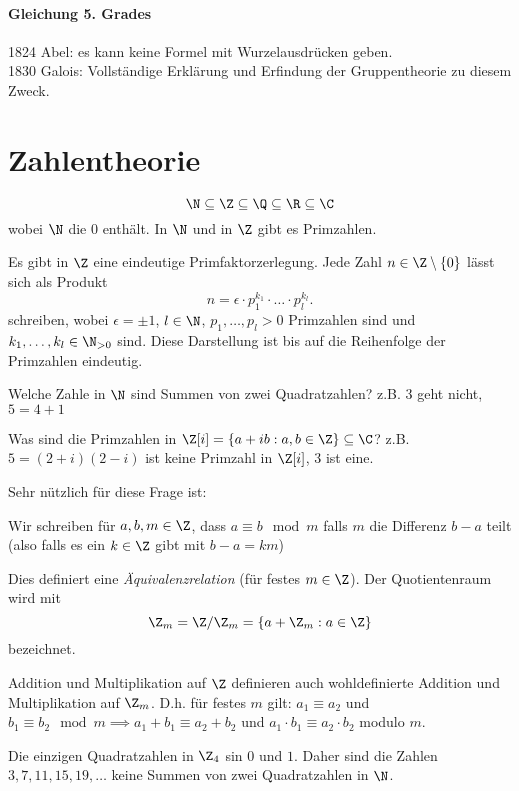 \paragraph{Gleichung 5. Grades}
1824 Abel: es kann keine Formel mit Wurzelausdrücken geben.\\
1830 Galois: Vollständige Erklärung und Erfindung der Gruppentheorie zu diesem Zweck.

\section{Zahlentheorie}
\[
\N \subseteq \Z \subseteq \Q \subseteq \R \subseteq \C
\] 
wobei $\N$ die $0$ enthält. In $\N$ und in $\Z$ gibt es Primzahlen.
\begin{theorem}
	Es gibt in $\Z$ eine eindeutige Primfaktorzerlegung.
	Jede Zahl $n \in \Z \setminus \{0\}$ lässt sich als Produkt
	\[
	n = \epsilon \cdot p_1^{k_1} \cdot \ldots \cdot p_{l}^{k_{l}}
	.\] 
	schreiben, wobei $\epsilon = \pm 1$, $l \in \N$, $p_1,\ldots,p_{l} > 0$ Primzahlen sind und $k_1,\ldots,k_{l} \in \N_{> 0}$ sind.
	Diese Darstellung ist bis auf die Reihenfolge der Primzahlen eindeutig.
\end{theorem}

Welche Zahle in $\N$ sind Summen von zwei Quadratzahlen?
z.B. $3$ geht nicht, $5 = 4+1$

Was sind die Primzahlen in $\Z[i] = \{a + ib: a,b \in \Z\} \subseteq \C$?
z.B. $5 = (2+i)(2-i)$ ist keine Primzahl in $\Z[i]$, $3$ ist eine.

Sehr nützlich für diese Frage ist:
\begin{definition}
	Wir schreiben für $a,b,m \in \Z$, dass $a \equiv b \mod m$ falls $m$ die Differenz $b-a$ teilt (also falls es ein  $k \in \Z$ gibt mit $b-a = k m $)
\end{definition}

Dies definiert eine \emph{Äquivalenzrelation} (für festes $m \in \Z$).
Der Quotientenraum wird mit 
\[
	\Z_{m} = \Z / \Z_{m} = \{a + \Z_{m}: a \in \Z\} 
\]
bezeichnet.

\begin{lemma}
	Addition und Multiplikation auf $\Z$ definieren auch wohldefinierte Addition und Multiplikation auf $\Z_{m}$.
	D.h. für festes $m$ gilt: $a_1 \equiv a_2$ und $b_1 \equiv b_2 \mod m \implies a_1 + b_1 \equiv a_2 + b_2$ und $a_1 \cdot b_1 \equiv a_2 \cdot b_2$ modulo $m$.
\end{lemma}


\begin{lemma}
	Die einzigen Quadratzahlen in $\Z_4$ sin $0$ und $1$.
	Daher sind die Zahlen $3,7,11,15,19,\ldots$ keine Summen von zwei Quadratzahlen in $\N$.
\end{lemma}


